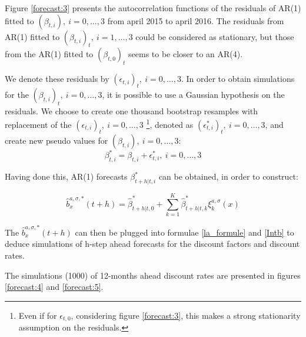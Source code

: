 
\medskip

Figure \ref{forecast:3} presents the autocorrelation functions of the residuals of AR(1)  fitted to $(\beta_{t, i}),  \: i = 0, \ldots, 3$ from april 2015 to april 2016. The residuals from AR(1) fitted to $(\beta_{t, i})_t, \: i = 1, \ldots, 3$ could be considered as stationary, but those from the AR(1) fitted to $(\beta_{t, 0})_t$ seems to be closer to an AR(4).

\medskip

We denote these residuals by $(\epsilon_{t, i})_t, \: i = 0, \ldots, 3$. In order to obtain simulations for the $(\beta_{t, i})_t,  \: i = 0, \ldots, 3$, it is possible to use a Gaussian hypothesis on the residuals. We choose to create one thousand bootstrap resamples with replacement of the $(\epsilon_{t, i})_t, \: i = 0, \ldots, 3$ \footnote{Even if for $\epsilon_{t, 0}$, considering figure \ref{forecast:3}, this makes a strong stationarity assumption on the residuals.}, denoted as $(\epsilon_{t, i}^*)_t, \: i = 0, \ldots, 3$, and create new pseudo values for $(\beta_{t, i}),  \: i = 0, \ldots, 3$:
$$
\beta^*_{t, i} = \beta_{t, i} + \epsilon_{t, i}^*,  \: i = 0, \ldots, 3
$$

\medskip

Having done this, AR(1) forecasts $\beta^*_{t+h|t, i}$ can be obtained, in order to construct:

\begin{equation}
\hat{b}^{a, \sigma, *}_{x}(t+h) = \hat{\beta}^*_{t+h|t, 0} + \sum_{k = 1}^K \hat{\beta}^*_{t+h|t, k} \xi^{a, \sigma}_k(x)
\end{equation}

\medskip

The $\hat{b}^{a, \sigma, *}_{x}(t+h)$ can then be plugged into formulae \ref{la_formule} and \ref{Intb} to deduce simulations of h-step ahead forecasts for the discount factors and discount rates.

\medskip

The simulations (1000) of 12-months ahead discount rates are presented in figures \ref{forecast:4} and \ref{forecast:5}.


